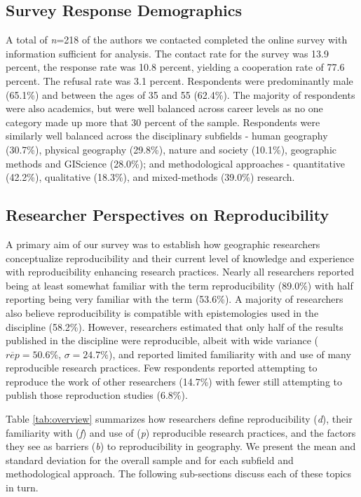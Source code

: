 \documentclass[]{interact}
\theoremstyle{plain}%
\theoremstyle{definition}
\theoremstyle{remark}
\begin{document}
\subsection*{Survey Response Demographics}
A total of \textit{n}=218 of the authors we contacted completed the online survey with information sufficient for analysis. 
The contact rate for the survey was 13.9 percent, the response rate was 10.8 percent, yielding a cooperation rate of 77.6 percent. 
The refusal rate was 3.1 percent.
Respondents were predominantly male (65.1\%) and between the ages of 35 and 55 (62.4\%). 
The majority of respondents were also academics, but were well balanced across career levels as no one category made up more that 30 percent of the sample.
Respondents were similarly well balanced across the disciplinary subfields - human geography (30.7\%), physical geography (29.8\%), nature and society (10.1\%), geographic methods and GIScience (28.0\%); and methodological approaches - quantitative (42.2\%), qualitative (18.3\%), and mixed-methods (39.0\%) research.

\subsection*{Researcher Perspectives on Reproducibility}
A primary aim of our survey was to establish how geographic researchers conceptualize reproducibility and their current level of knowledge and experience with reproducibility enhancing research practices.
Nearly all researchers reported being at least somewhat familiar with the term reproducibility (89.0\%) with half reporting being very familiar with the term (53.6\%).
A majority of researchers also believe reproducibility is compatible with epistemologies used in the discipline (58.2\%). 
However, researchers estimated that only half of the results published in the discipline were reproducible, albeit with wide variance ($\overline{rep}=50.6\%$, $\sigma=24.7\%$), and reported limited familiarity with and use of many reproducible research practices. 
Few respondents reported attempting to reproduce the work of other researchers (14.7\%) with fewer still attempting to publish those reproduction studies (6.8\%). 

Table \ref{tab:overview} summarizes how  researchers define reproducibility (\textit{d}), their familiarity with (\textit{f}) and use of (\textit{p}) reproducible research practices, and the factors they see as barriers (\textit{b}) to reproducibility in geography. 
We present the mean and standard deviation for the overall sample and for each subfield and methodological approach.
The following sub-sections discuss each of these topics in turn.
\end{document}
